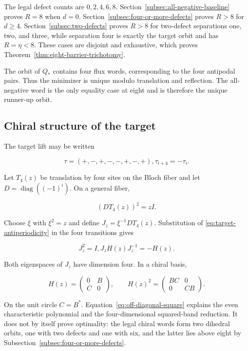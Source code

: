 The legal defect counts are \(0,2,4,6,8\). Section~\ref{subsec:all-negative-baseline} proves \(R=8\) when
\(d=0\). Section~\ref{subsec:four-or-more-defects} proves \(R>8\) for \(d\geq 4\). Section~\ref{subsec:two-defects} proves \(R>8\) for
two-defect separations one, two, and three, while separation four is exactly
the target orbit and has \(R=\eta<8\). These cases are disjoint and exhaustive,
which proves Theorem~\ref{thm:eight-barrier-trichotomy}.

The orbit of \(Q_*\) contains four flux words, corresponding to the four
antipodal pairs. Thus the minimizer is unique modulo translation and
reflection. The all-negative word is the only equality case at eight and is
therefore the unique runner-up orbit.

\subsection{Chiral structure of the target}

The target lift may be written

\begin{equation}
\label{eq:target-antiperiodicity}
\tau=(+,-,+,-,-,+,-,+),       \tau_{i+4}=-\tau_i.
\end{equation}

Let \(T_{4}(z)\) be translation by four sites on the Bloch fiber and let
\(D=\operatorname{diag}((-1)^i)\). On a general fiber,

\begin{equation}
(D T_{4}(z))^{2}=zI.
\end{equation}

Choose \(\xi\) with \(\xi^{2}=z\) and define \(J_z=\xi^{-1}D T_{4}(z)\). Substitution of
\eqref{eq:target-antiperiodicity} in the four transitions gives

\begin{equation}
\label{eq:chiral-symmetry}
J_z^{2}=I,       J_z H(z)J_z^{-1}=-H(z).
\end{equation}

Both eigenspaces of \(J_z\) have dimension four. In a chiral basis,

\begin{equation}
\label{eq:off-diagonal-square}
H(z)=\begin{pmatrix}0&B\\C&0\end{pmatrix},\qquad H(z)^2=\begin{pmatrix}BC&0\\0&CB\end{pmatrix}.
\end{equation}

On the unit circle \(C=B^{\ast}\). Equation~\eqref{eq:off-diagonal-square} explains the even characteristic
polynomial and the four-dimensional squared-band reduction. It does not by
itself prove optimality: the legal chiral words form two dihedral orbits, one
with two defects and one with six, and the latter lies above eight by
Subsection~\ref{subsec:four-or-more-defects}.
